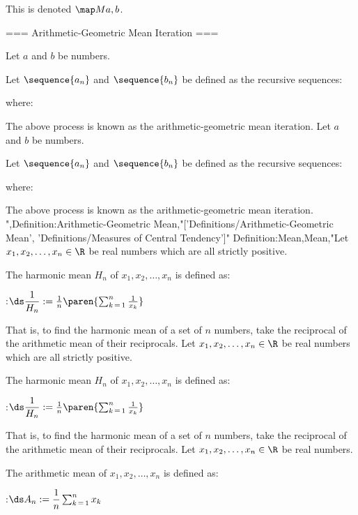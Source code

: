 This is denoted $\map M {a, b}$.


=== Arithmetic-Geometric Mean Iteration ===

Let $a$ and $b$ be numbers.

Let $\sequence {a_n}$ and $\sequence {b_n}$ be defined as the recursive sequences:







where:






The above process is known as the arithmetic-geometric mean iteration.
Let $a$ and $b$ be numbers.

Let $\sequence {a_n}$ and $\sequence {b_n}$ be defined as the recursive sequences:







where:






The above process is known as the arithmetic-geometric mean iteration.
",Definition:Arithmetic-Geometric Mean,"['Definitions/Arithmetic-Geometric Mean', 'Definitions/Measures of Central Tendency']"
Definition:Mean,Mean,"Let $x_1, x_2, \ldots, x_n \in \R$ be real numbers which are all strictly positive.

The harmonic mean $H_n$ of $x_1, x_2, \ldots, x_n$ is defined as:

:$\ds \dfrac 1 {H_n} := \frac 1 n \paren {\sum_{k \mathop = 1}^n \frac 1 {x_k} }$

That is, to find the harmonic mean of a set of $n$ numbers, take the reciprocal of the arithmetic mean of their reciprocals.
Let $x_1, x_2, \ldots, x_n \in \R$ be real numbers which are all strictly positive.

The harmonic mean $H_n$ of $x_1, x_2, \ldots, x_n$ is defined as:

:$\ds \dfrac 1 {H_n} := \frac 1 n \paren {\sum_{k \mathop = 1}^n \frac 1 {x_k} }$

That is, to find the harmonic mean of a set of $n$ numbers, take the reciprocal of the arithmetic mean of their reciprocals.
Let $x_1, x_2, \ldots, x_n \in \R$ be real numbers.

The arithmetic mean of $x_1, x_2, \ldots, x_n$ is defined as:

:$\ds A_n := \dfrac 1 n \sum_{k \mathop = 1}^n x_k$

